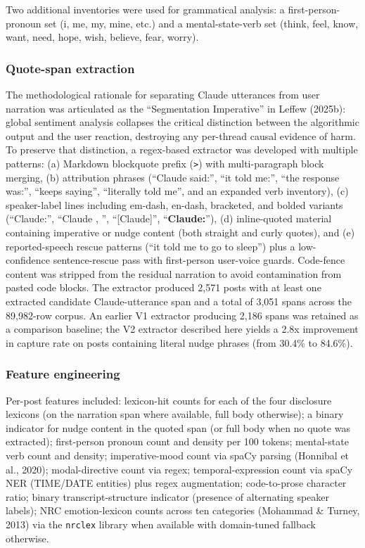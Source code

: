 \documentclass[11pt]{article}
\begin{document}
Two additional inventories were used for grammatical analysis: a first-person-pronoun set (i, me, my, mine, etc.) and a mental-state-verb set (think, feel, know, want, need, hope, wish, believe, fear, worry).

\subsubsection{Quote-span extraction}

The methodological rationale for separating Claude utterances from user narration was articulated as the ``Segmentation Imperative'' in Leffew (2025b): global sentiment analysis collapses the critical distinction between the algorithmic output and the user reaction, destroying any per-thread causal evidence of harm. To preserve that distinction, a regex-based extractor was developed with multiple patterns: (a) Markdown blockquote prefix (\texttt{>}) with multi-paragraph block merging, (b) attribution phrases (``Claude said:'', ``it told me:'', ``the response was:'', ``keeps saying'', ``literally told me'', and an expanded verb inventory), (c) speaker-label lines including em-dash, en-dash, bracketed, and bolded variants (``Claude:'', ``Claude , '', ``[Claude]'', ``\textbf{Claude:}''), (d) inline-quoted material containing imperative or nudge content (both straight and curly quotes), and (e) reported-speech rescue patterns (``it told me to go to sleep'') plus a low-confidence sentence-rescue pass with first-person user-voice guards. Code-fence content was stripped from the residual narration to avoid contamination from pasted code blocks. The extractor produced 2,571 posts with at least one extracted candidate Claude-utterance span and a total of 3,051 spans across the 89,982-row corpus. An earlier V1 extractor producing 2,186 spans was retained as a comparison baseline; the V2 extractor described here yields a 2.8x improvement in capture rate on posts containing literal nudge phrases (from 30.4\% to 84.6\%).

\subsubsection{Feature engineering}

Per-post features included: lexicon-hit counts for each of the four disclosure lexicons (on the narration span where available, full body otherwise); a binary indicator for nudge content in the quoted span (or full body when no quote was extracted); first-person pronoun count and density per 100 tokens; mental-state verb count and density; imperative-mood count via spaCy parsing (Honnibal et al., 2020); modal-directive count via regex; temporal-expression count via spaCy NER (TIME/DATE entities) plus regex augmentation; code-to-prose character ratio; binary transcript-structure indicator (presence of alternating speaker labels); NRC emotion-lexicon counts across ten categories (Mohammad \& Turney, 2013) via the \texttt{nrclex} library when available with domain-tuned fallback otherwise.
\end{document}

